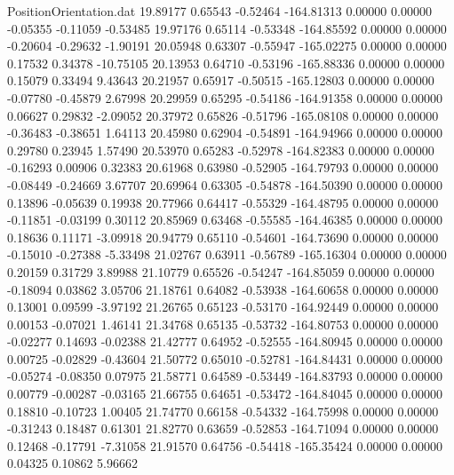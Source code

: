 \begin{filecontents}{PositionOrientation.dat}
  19.89177    0.65543   -0.52464  -164.81313    0.00000    0.00000   -0.05355   -0.11059   -0.53485
  19.97176    0.65114   -0.53348  -164.85592    0.00000    0.00000   -0.20604   -0.29632   -1.90191
  20.05948    0.63307   -0.55947  -165.02275    0.00000    0.00000    0.17532    0.34378  -10.75105
  20.13953    0.64710   -0.53196  -165.88336    0.00000    0.00000    0.15079    0.33494    9.43643
  20.21957    0.65917   -0.50515  -165.12803    0.00000    0.00000   -0.07780   -0.45879    2.67998
  20.29959    0.65295   -0.54186  -164.91358    0.00000    0.00000    0.06627    0.29832   -2.09052
  20.37972    0.65826   -0.51796  -165.08108    0.00000    0.00000   -0.36483   -0.38651    1.64113
  20.45980    0.62904   -0.54891  -164.94966    0.00000    0.00000    0.29780    0.23945    1.57490
  20.53970    0.65283   -0.52978  -164.82383    0.00000    0.00000   -0.16293    0.00906    0.32383
  20.61968    0.63980   -0.52905  -164.79793    0.00000    0.00000   -0.08449   -0.24669    3.67707
  20.69964    0.63305   -0.54878  -164.50390    0.00000    0.00000    0.13896   -0.05639    0.19938
  20.77966    0.64417   -0.55329  -164.48795    0.00000    0.00000   -0.11851   -0.03199    0.30112
  20.85969    0.63468   -0.55585  -164.46385    0.00000    0.00000    0.18636    0.11171   -3.09918
  20.94779    0.65110   -0.54601  -164.73690    0.00000    0.00000   -0.15010   -0.27388   -5.33498
  21.02767    0.63911   -0.56789  -165.16304    0.00000    0.00000    0.20159    0.31729    3.89988
  21.10779    0.65526   -0.54247  -164.85059    0.00000    0.00000   -0.18094    0.03862    3.05706
  21.18761    0.64082   -0.53938  -164.60658    0.00000    0.00000    0.13001    0.09599   -3.97192
  21.26765    0.65123   -0.53170  -164.92449    0.00000    0.00000    0.00153   -0.07021    1.46141
  21.34768    0.65135   -0.53732  -164.80753    0.00000    0.00000   -0.02277    0.14693   -0.02388
  21.42777    0.64952   -0.52555  -164.80945    0.00000    0.00000    0.00725   -0.02829   -0.43604
  21.50772    0.65010   -0.52781  -164.84431    0.00000    0.00000   -0.05274   -0.08350    0.07975
  21.58771    0.64589   -0.53449  -164.83793    0.00000    0.00000    0.00779   -0.00287   -0.03165
  21.66755    0.64651   -0.53472  -164.84045    0.00000    0.00000    0.18810   -0.10723    1.00405
  21.74770    0.66158   -0.54332  -164.75998    0.00000    0.00000   -0.31243    0.18487    0.61301
  21.82770    0.63659   -0.52853  -164.71094    0.00000    0.00000    0.12468   -0.17791   -7.31058
  21.91570    0.64756   -0.54418  -165.35424    0.00000    0.00000    0.04325    0.10862    5.96662

\end{filecontents}
